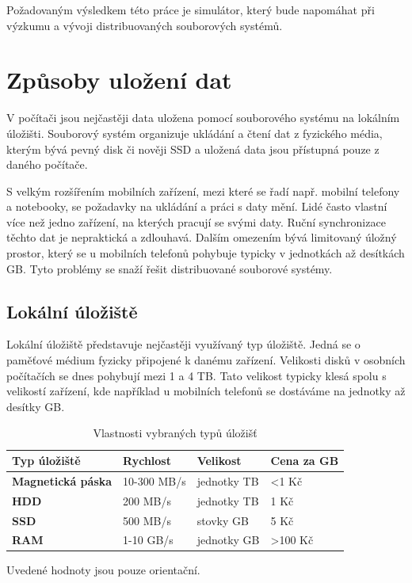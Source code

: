 \documentclass[czech,DP]{thesiskiv}
\begin{document}
Požadovaným výsledkem této práce je simulátor, který bude napomáhat při výzkumu a vývoji distribuovaných souborových systémů.
  
\chapter{Způsoby uložení dat} \label{ulozenidat}

V počítači jsou nejčastěji data uložena pomocí souborového systému na lokálním úložišti. Souborový systém organizuje ukládání a čtení dat z fyzického média, kterým bývá pevný disk či nověji SSD a uložená data jsou přístupná pouze z daného počítače.

S velkým rozšířením mobilních zařízení, mezi které se řadí např. mobilní telefony a notebooky, se požadavky na ukládání a práci s daty mění. Lidé často vlastní více než jedno zařízení, na kterých pracují se svými daty. Ruční synchronizace těchto dat je nepraktická a zdlouhavá. Dalším omezením bývá limitovaný úložný prostor, který se u mobilních telefonů pohybuje typicky v jednotkách až desítkách GB. Tyto problémy se snaží řešit distribuované souborové systémy.
 
\section{Lokální úložiště} \label{localstorage}
 
Lokální úložiště představuje nejčastěji využívaný typ úložiště. Jedná se o paměťové médium fyzicky připojené k danému zařízení. Velikosti disků v osobních počítačích se dnes pohybují mezi 1 a 4 TB. Tato velikost typicky klesá spolu s velikostí zařízení, kde například u mobilních telefonů se dostáváme na jednotky až desítky GB. 

\begin{table}[]
\begin{threeparttable}
\centering
\caption{Vlastnosti vybraných typů úložišť}
\label{localstortable}
\begin{tabular}{|l|l|l|l|}
\hline
\textbf{Typ úložiště}     & \textbf{Rychlost} & \textbf{Velikost} & \textbf{Cena za GB} \\ \hline
\textbf{Magnetická páska} & 10-300 MB/s                 & jednotky TB               & \textless 1 Kč      \\ \hline
\textbf{HDD}              & 200 MB/s                    & jednotky TB               & 1 Kč                \\ \hline
\textbf{SSD}              & 500 MB/s                    & stovky GB                 & 5 Kč                \\ \hline
\textbf{RAM}          & 1-10 GB/s                   & jednotky GB               & \textgreater 100 Kč \\ \hline
\end{tabular}
\begin{tablenotes}
\small
\item Uvedené hodnoty jsou pouze orientační.
\end{tablenotes}
\end{threeparttable}
\end{table}
\end{document}
